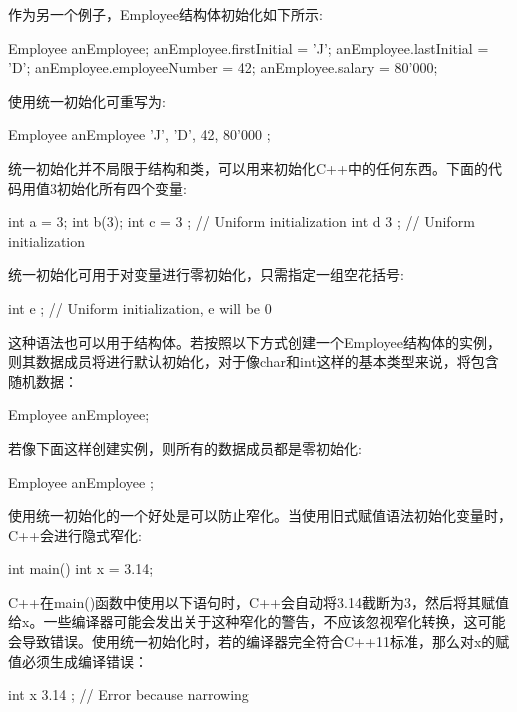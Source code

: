 作为另一个例子，Employee结构体初始化如下所示:

\begin{cpp}
Employee anEmployee;
anEmployee.firstInitial = 'J';
anEmployee.lastInitial = 'D';
anEmployee.employeeNumber = 42;
anEmployee.salary = 80'000;
\end{cpp}

使用统一初始化可重写为:

\begin{cpp}
Employee anEmployee { 'J', 'D', 42, 80'000 };
\end{cpp}

统一初始化并不局限于结构和类，可以用来初始化C++中的任何东西。下面的代码用值3初始化所有四个变量:

\begin{cpp}
int a = 3;
int b(3);
int c = { 3 }; // Uniform initialization
int d { 3 }; // Uniform initialization
\end{cpp}

统一初始化可用于对变量进行零初始化，只需指定一组空花括号:

\begin{cpp}
int e { }; // Uniform initialization, e will be 0
\end{cpp}

这种语法也可以用于结构体。若按照以下方式创建一个Employee结构体的实例，则其数据成员将进行默认初始化，对于像char和int这样的基本类型来说，将包含随机数据：

\begin{cpp}
Employee anEmployee;
\end{cpp}

若像下面这样创建实例，则所有的数据成员都是零初始化:

\begin{cpp}
Employee anEmployee { };
\end{cpp}

使用统一初始化的一个好处是可以防止窄化。当使用旧式赋值语法初始化变量时，C++会进行隐式窄化:

\begin{cpp}
int main()
{
    int x = 3.14;
}
\end{cpp}

C++在main()函数中使用以下语句时，C++会自动将3.14截断为3，然后将其赋值给x。一些编译器可能会发出关于这种窄化的警告，不应该忽视窄化转换，这可能会导致错误。使用统一初始化时，若的编译器完全符合C++11标准，那么对x的赋值必须生成编译错误：

\begin{cpp}
int x { 3.14 }; // Error because narrowing
\end{cpp}

